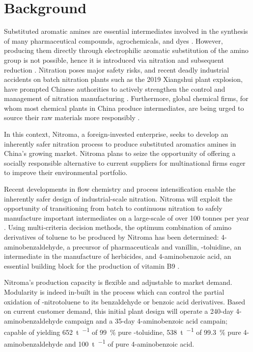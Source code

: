\section*{Background}

Substituted aromatic amines are essential intermediates involved in the synthesis of many pharmaceutical compounds, agrochemicals, and dyes \cite{vogt_amines_2000}. However, producing them directly through electrophilic aromatic substitution of the amino group is not possible, hence it is introduced via nitration and subsequent reduction \cite{dugal_nitrobenzene_2005}. Nitration poses major safety risks, and recent deadly industrial accidents on batch nitration plants such as the 2019 Xiangshui plant explosion, have prompted Chinese authorities to actively strengthen the control and management of nitration manufacturing \cite{el_diario_china_2019}. Furthermore, global chemical firms, for whom most chemical plants in China produce intermediates, are being urged to source their raw materials more responsibly \cite{stanway_global_2019}.

In this context, Nitroma, a foreign-invested enterprise, seeks to develop an inherently safer nitration process to produce substituted aromatics amines in China's growing market. Nitroma plans to seize the opportunity of offering a socially responsible alternative to current suppliers for multinational firms eager to improve their environmental portfolio. 

Recent developments in flow chemistry and process intensification enable the inherently safer design of industrial-scale nitration. Nitroma will exploit the opportunity of transitioning from batch to continuous nitration to safely manufacture important intermediates on a large-scale of over 100 tonnes per year \cite{di_miceli_raimondi_safety_2015}. Using multi-criteria decision methods, the optimum combination of amino derivatives of toluene to be produced by Nitroma has been determined: 4-aminobenzaldehyde, a precursor of pharmaceuticals and vanillin, \ortho-toluidine, an intermediate in the manufacture of herbicides, and 4-aminobenzoic acid, an essential building block for the production of vitamin B9 \cite{bowers_toluidines_2000,bruhne_benzaldehyde_2011,maki_benzoic_2000}.

Nitroma's production capacity is flexible and adjustable to market demand. Modularity is indeed in-built in the process which can control the partial oxidation of \para-nitrotoluene to its benzaldehyde or benzoic acid derivatives. Based on current customer demand, this initial plant design will operate a 240-day 4-aminobenzaldehyde campaign and a 35-day 4-aminobenzoic acid campain; capable of yielding \SI{652}{\tonne\per\year} of \SI{99}{\percent} pure \ortho-toluidine, \SI{538}{\tonne\per\year} of \SI{99.3}{\percent} pure 4-aminobenzaldehyde and \SI{100}{\tonne\per\year} of pure 4-aminobenzoic acid.

